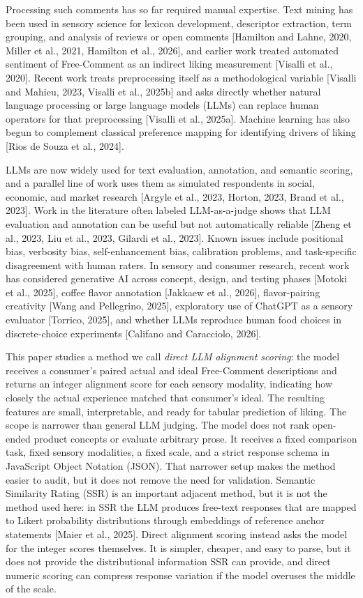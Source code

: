 \documentclass[11pt]{article}
\begin{document}
Processing such comments has so far required manual expertise. Text mining has
been used in sensory science for lexicon development, descriptor extraction,
term grouping, and analysis of reviews or open comments [Hamilton and Lahne,
2020, Miller et al., 2021, Hamilton et al., 2026], and earlier work treated
automated sentiment of Free-Comment as an indirect liking measurement [Visalli
et al., 2020]. Recent work treats preprocessing itself as a methodological
variable [Visalli and Mahieu, 2023, Visalli et al., 2025b] and asks directly
whether natural language processing or large language models (LLMs) can replace
human operators for that preprocessing [Visalli et al., 2025a]. Machine
learning has also begun to complement classical preference mapping for
identifying drivers of liking [Rios de Souza et al., 2024].

LLMs are now widely used for text evaluation, annotation, and semantic scoring,
and a parallel line of work uses them as simulated respondents in social,
economic, and market research [Argyle et al., 2023, Horton, 2023, Brand et al.,
2023]. Work in the literature often labeled LLM-as-a-judge shows that LLM
evaluation and annotation can be useful but not automatically reliable [Zheng
et al., 2023, Liu et al., 2023, Gilardi et al., 2023]. Known issues include
positional bias, verbosity bias, self-enhancement bias, calibration problems,
and task-specific disagreement with human raters. In sensory and consumer
research, recent work has considered generative AI across concept, design, and
testing phases [Motoki et al., 2025], coffee flavor annotation [Jakkaew et al.,
2026], flavor-pairing creativity [Wang and Pellegrino, 2025], exploratory use
of ChatGPT as a sensory evaluator [Torrico, 2025], and whether LLMs reproduce
human food choices in discrete-choice experiments [Califano and Caracciolo,
2026].

This paper studies a method we call \emph{direct LLM alignment scoring}: the
model receives a consumer's paired actual and ideal Free-Comment descriptions
and returns an integer alignment score for each sensory modality, indicating
how closely the actual experience matched that consumer's ideal. The resulting
features are small, interpretable, and ready for tabular prediction of liking.
The scope is narrower than general LLM judging. The model does not rank
open-ended product concepts or evaluate arbitrary prose. It receives a fixed
comparison task, fixed sensory modalities, a fixed scale, and a strict response
schema in JavaScript Object Notation (JSON). That narrower setup makes the
method easier to audit, but it does not remove the need for validation.
Semantic Similarity Rating (SSR) is an important adjacent method, but it is not
the method used here: in SSR the LLM produces free-text responses that are
mapped to Likert probability distributions through embeddings of reference
anchor statements [Maier et al., 2025]. Direct alignment scoring instead asks
the model for the integer scores themselves. It is simpler, cheaper, and easy
to parse, but it does not provide the distributional information SSR can
provide, and direct numeric scoring can compress response variation if the
model overuses the middle of the scale.
\end{document}
